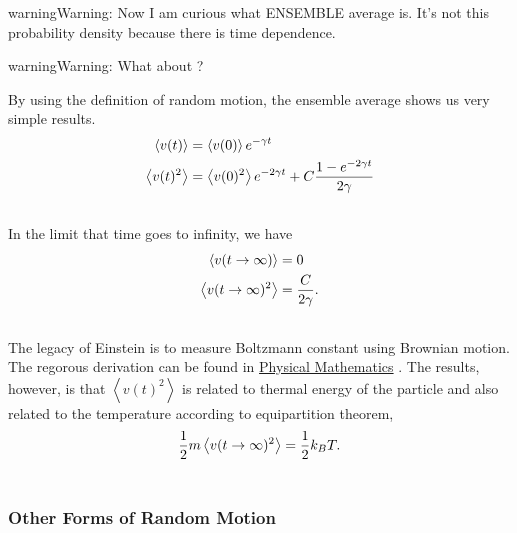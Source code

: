 \documentclass[letterpaper,10pt,english]{sphinxmanual}
\newcommand{\avg}[1]{\left< #1 \right>}
\begin{document}
\begin{notice}{warning}{Warning:}
Now I am curious what ENSEMBLE average is. It's not this probability density because there is time dependence.
\end{notice}

\begin{notice}{warning}{Warning:}
What about ?
\end{notice}

By using the definition of random motion, the ensemble average shows us very simple results.
\begin{gather}
\begin{split}\avg{v(t)} &= \avg{v(0)} e^{-\gamma t} \\
\avg{v(t)^2} & = \avg{v(0)^2}e^{-2\gamma t} + C \frac{1- e^{-2\gamma t}}{2\gamma}\end{split}\notag\\\begin{split}\end{split}\notag
\end{gather}
In the limit that time goes to infinity, we have
\begin{gather}
\begin{split}\avg{v(t\to\infty)} & = 0 \\
\avg{v(t\to \infty)^2} & = \frac{C}{2\gamma} .\end{split}\notag\\\begin{split}\end{split}\notag
\end{gather}
The legacy of Einstein is to measure Boltzmann constant using Brownian motion. The regorous derivation can be found in \href{http://books.google.com/books?id=74ggAwAAQBAJ}{Physical Mathematics} . The results, however, is that $\avg{v(t)^2}$ is related to thermal energy of the particle and also related to the temperature according to equipartition theorem,
\begin{gather}
\begin{split}\frac{1}{2}m \avg{v(t\to \infty)^2} = \frac{1}{2}k_B T .\end{split}\notag\\\begin{split}\end{split}\notag
\end{gather}

\subsubsection{Other Forms of Random Motion}
\label{nonequilibrium/brownianMotion:other-forms-of-random-motion}
\end{document}
